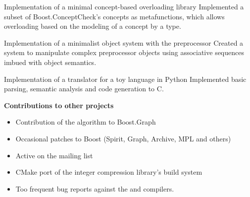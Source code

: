 \documentclass[10pt]{moderncv}
\newcommand{\myhref}[3][blue]{\href{#2}{\color{#1}{#3}}}
\begin{document}
{Implementation of a minimal concept-based overloading library}{
    Implemented a subset of Boost.ConceptCheck's concepts as metafunctions,
    which allows overloading based on the modeling of a concept by a type.}

{Implementation of a minimalist object system with the preprocessor}{
    Created a system to manipulate complex preprocessor objects using
    associative sequences imbued with object semantics.}

{Implementation of a translator for a toy language in Python}{
    Implemented basic parsing, semantic analysis and code generation to C.}

\cvline{}
{\textbf{Contributions to other projects}
\begin{itemize}
    \item Contribution of the \myhref{http://www.boost.org/doc/libs/release/libs/graph/doc/hawick_circuits.html}{hawick\_circuits} algorithm to Boost.Graph
    \item Occasional patches to Boost (Spirit, Graph, Archive, MPL and others)
    \item Active on the \myhref{http://news.gmane.org/gmane.comp.lib.boost.devel}{Boost.Dev} mailing list
    \item CMake port of the \myhref{http://github.com/lemire/FastPFor}{FastPFor}
          integer compression library's build system
    \item Too frequent bug reports against the \myhref{https://goo.gl/y9pYWP}{Clang}
          and \myhref{https://goo.gl/IhKUrK}{GCC} compilers.
\end{itemize}}
\end{document}

